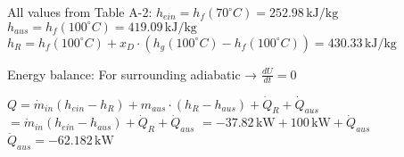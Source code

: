 All values from Table A-2:  
\( h_{ein} = h_f(70^\circ C) = 252.98 \, \text{kJ/kg} \)  
\( h_{aus} = h_f(100^\circ C) = 419.09 \, \text{kJ/kg} \)  
\( h_R = h_f(100^\circ C) + x_D \cdot (h_g(100^\circ C) - h_f(100^\circ C)) = 430.33 \, \text{kJ/kg} \)  

Energy balance:  
For surrounding adiabatic → \( \frac{dU}{dt} = 0 \)  

\( Q = \dot{m}_{in}(h_{ein} - h_R) + m_{aus} \cdot (h_R - h_{aus}) + \dot{Q}_R + \dot{Q}_{aus} \)  
\( = \dot{m}_{in}(h_{ein} - h_{aus}) + \dot{Q}_R + \dot{Q}_{aus} \)  
\( = -37.82 \, \text{kW} + 100 \, \text{kW} + \dot{Q}_{aus} \)  
\( \dot{Q}_{aus} = -62.182 \, \text{kW} \)